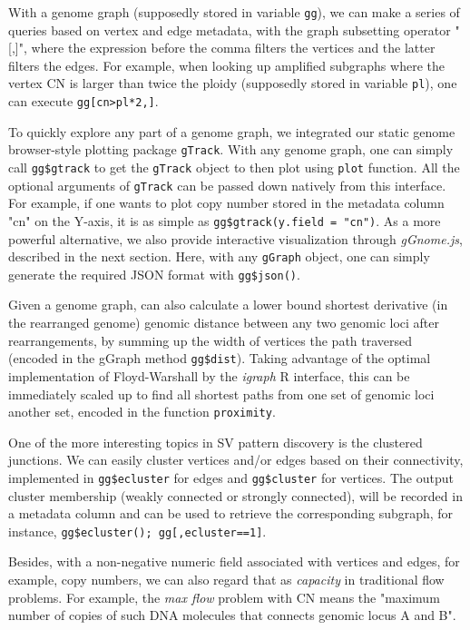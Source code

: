 \documentclass[phd,tocprelim]{cornell}
\begin{document}
With a genome graph (supposedly stored in variable \texttt{gg}), we can make a series of queries based on vertex and edge metadata, with the graph subsetting operator "[,]", where the expression before the comma filters the vertices and the latter filters the edges. For example, when looking up amplified subgraphs where the vertex CN is larger than twice the ploidy (supposedly stored in variable \texttt{pl}), one can execute \texttt{gg[cn>pl*2,]}. 

To quickly explore any part of a genome graph, we integrated our static genome browser-style plotting package \texttt{gTrack}. With any genome graph, one can simply call \texttt{gg\$gtrack} to get the \texttt{gTrack} object to then plot using \texttt{plot} function. All the optional arguments of \texttt{gTrack} can be passed down natively from this interface. For example, if one wants to plot copy number stored in the metadata column "cn" on the Y-axis, it is as simple as \texttt{gg\$gtrack(y.field = "cn")}. As a more powerful alternative, we also provide interactive visualization through \textit{gGnome.js}, described in the next section. Here, with any \texttt{gGraph} object, one can simply generate the required JSON format with \texttt{gg\$json()}.

Given a genome graph, can also calculate a lower bound  shortest derivative (in the rearranged genome) genomic distance between any two genomic loci after rearrangements, by summing up the width of vertices the path traversed (encoded in the gGraph method \texttt{gg\$dist}). Taking advantage of the optimal implementation of Floyd-Warshall by the \textit{igraph} R interface, this can be immediately scaled up to find all shortest paths from one set of genomic loci another set, encoded in the function \texttt{proximity}.

One of the more interesting topics in SV pattern discovery is the clustered junctions. We can easily cluster vertices and/or edges based on their connectivity, implemented in \texttt{gg\$ecluster} for edges and \texttt{gg\$cluster} for vertices. The output cluster membership (weakly connected or strongly connected), will be recorded in a metadata column and can be used to retrieve the corresponding subgraph, for instance, \texttt{gg\$ecluster(); gg[,ecluster==1]}.

Besides, with a non-negative numeric field associated with vertices and edges, for example, copy numbers, we can also regard that as \textit{capacity} in traditional flow problems. For example, the \textit{max flow} problem with CN means the "maximum number of copies of such DNA molecules that connects genomic locus A and B".
\end{document}
